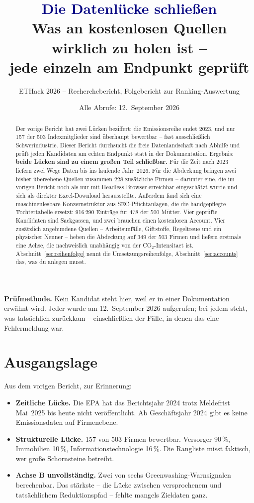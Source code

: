 \documentclass[11pt,a4paper]{article}
\title{\textcolor{navy}{Die Datenlücke schließen}\\[4mm]
\large Was an kostenlosen Quellen wirklich zu holen ist --\\
jede einzeln am Endpunkt geprüft}
\author{ETHack 2026 -- Recherchebericht, Folgebericht zur Ranking-Auswertung}
\date{Alle Abrufe: 12.~September 2026}
\newcommand{\befund}[1]{%
  \par\vspace{2pt}\noindent\colorbox{softgrey}{%
  \begin{minipage}{\dimexpr\linewidth-2\fboxsep}\small\vspace{3pt}#1\vspace{3pt}\end{minipage}}\par\vspace{4pt}}
\begin{document}
\maketitle

\begin{abstract}
\noindent
Der vorige Bericht hat zwei Lücken beziffert: die Emissionsreihe endet 2023, und nur 157 der 503 Indexmitglieder sind überhaupt bewertbar -- fast ausschließlich Schwerindustrie. Dieser Bericht durchsucht die freie Datenlandschaft nach Abhilfe und prüft jeden Kandidaten am echten Endpunkt statt in der Dokumentation. Ergebnis: \textbf{beide Lücken sind zu einem großen Teil schließbar.} Für die Zeit nach 2023 liefern zwei Wege Daten bis ins laufende Jahr~2026. Für die Abdeckung bringen zwei bisher übersehene Quellen zusammen 228 zusätzliche Firmen -- darunter eine, die im vorigen Bericht noch als \glqq nur mit Headless-Browser erreichbar\grqq{} eingeschätzt wurde und sich als direkter Excel-Download herausstellte. Außerdem fand sich eine maschinenlesbare Konzernstruktur aus SEC-Pflichtanlagen, die die handgepflegte Tochtertabelle ersetzt: 916\,290 Einträge für 478 der 500 Mütter. Vier geprüfte Kandidaten sind Sackgassen, und zwei brauchen einen kostenlosen Account. Vier zusätzlich angebundene Quellen -- Arbeitsunfälle, Giftstoffe, Regeltreue und ein physischer Nenner -- heben die Abdeckung auf 349 der 503 Firmen und liefern erstmals eine Achse, die nachweislich unabhängig von der CO$_2$-Intensitaet ist. Abschnitt~\ref{sec:reihenfolge} nennt die Umsetzungsreihenfolge, Abschnitt~\ref{sec:accounts} das, was du anlegen musst.
\end{abstract}

\vspace{2mm}
\befund{\textbf{Prüfmethode.} Kein Kandidat steht hier, weil er in einer Dokumentation erwähnt wird. Jeder wurde am 12.~September 2026 aufgerufen; bei jedem steht, was tatsächlich zurückkam -- einschließlich der Fälle, in denen das eine Fehlermeldung war.}

\tableofcontents
\newpage

\section{Ausgangslage}

Aus dem vorigen Bericht, zur Erinnerung:

\begin{itemize}
\item \textbf{Zeitliche Lücke.} Die EPA hat das Berichtsjahr 2024 trotz Meldefrist Mai~2025 bis heute nicht veröffentlicht. Ab Geschäftsjahr 2024 gibt es keine Emissionsdaten auf Firmenebene.
\item \textbf{Strukturelle Lücke.} 157 von 503 Firmen bewertbar. Versorger 90\,\%, Immobilien 10\,\%, Informationstechnologie 16\,\%. Die Rangliste misst faktisch, wer große Schornsteine betreibt.
\item \textbf{Achse B unvollständig.} Zwei von sechs Greenwashing-Warnsignalen berechenbar. Das stärkste -- die Lücke zwischen versprochenem und tatsächlichem Reduktionspfad -- fehlte mangels Zieldaten ganz.
\end{itemize}
\end{document}
